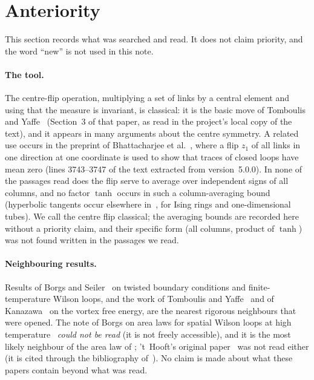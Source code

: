 \documentclass[11pt,a4paper]{article}
\theoremstyle{plain}
\theoremstyle{definition}
\theoremstyle{remark}
\numberwithin{equation}{section}
\newcommand{\lean}[1]{\texttt{\expandafter\leanbk\detokenize{#1}\relax}}
\def\leanbk#1{\ifx#1\relax\else\ifx#1.#1\allowbreak\else\ifx#1_#1\allowbreak\else#1\fi\fi\expandafter\leanbk\fi}
\begin{document}
\section{Anteriority}\label{sec:anteriority}
This section records what was searched and read. It does not claim priority, and the word ``new'' is not used in this note.

\paragraph{The tool.} The centre-flip operation, multiplying a set of links by a central element and using that the measure is invariant, is classical: it is the basic move of Tomboulis and Yaffe~\cite{TY85} (Section~3 of that paper, as read in the project's local copy of the text), and it appears in many arguments about the centre symmetry. A related use occurs in the preprint of Bhattacharjee et al.~\cite{BB26}, where a flip $z_1$ of all links in one direction at one coordinate is used to show that traces of closed loops have mean zero (lines 3743--3747 of the text extracted from version~5.0.0). In none of the passages read does the flip serve to average over independent signs of all columns, and no factor $\tanh$ occurs in such a column-averaging bound (hyperbolic tangents occur elsewhere in~\cite{BB26}, for Ising rings and one-dimensional tubes). We call the centre flip classical; the averaging bounds are recorded here without a priority claim, and their specific form (all columns, product of $\tanh$) was not found written in the passages we read.

\paragraph{Neighbouring results.} Results of Borgs and Seiler~\cite{BS83} on twisted boundary conditions and finite-temperature Wilson loops, and the work of Tomboulis and Yaffe~\cite{TY85} and of Kanazawa~\cite{Kan} on the vortex free energy, are the nearest rigorous neighbours that were opened. The note of Borgs on area laws for spatial Wilson loops at high temperature~\cite{Bor85} \emph{could not be read} (it is not freely accessible), and it is the most likely neighbour of the area law of \lean{tube_area_law_rectangle}; 't~Hooft's original paper~\cite{tH79} was not read either (it is cited through the bibliography of~\cite{TY85}). No claim is made about what these papers contain beyond what was read.
\end{document}
